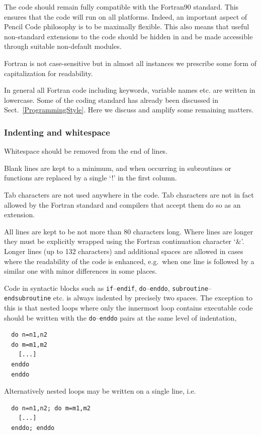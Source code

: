 \documentclass[\mydriver,12pt,twoside,notitlepage,a4paper]{article}
\newcommand{\code}[1]{\texttt{#1}}
\begin{document}
The code should remain fully compatible with the Fortran90 standard.
This ensures that the code will run on all platforms.
Indeed, an important aspect of {\sc Pencil Code} philosophy is to be maximally flexible.
This also means that useful non-standard extensions to the code should be hidden in and
be made accessible through suitable non-default modules.

Fortran is not case-sensitive but in almost all instances we prescribe
some form of capitalization for readability.

In general all Fortran code including keywords, variable names etc. are
written in lowercase.
Some of the coding standard has already been discussed in
Sect.~\ref{ProgrammingStyle}.
Here we discuss and amplify some remaining matters.

\subsubsection{Indenting and whitespace}

Whitespace should be removed from the end of lines.

Blank lines are kept to a minimum, and when occurring in subroutines
or functions are replaced by a single `!' in the first column.

Tab characters are not used anywhere in the code.  Tab characters are
not in fact allowed by the Fortran standard and compilers that accept
them do so as an extension.

All lines are kept to be not more than 80 characters long.
Where lines are longer they must be explicitly wrapped using the
Fortran continuation character `\&'.
Longer lines (up to 132 characters) and additional spaces are allowed
in cases where the readability of the code is enhanced, e.g.\ when one
line is followed by a similar one with minor differences in some places.

Code in syntactic blocks such as \code{if}--\code{endif}, \code{do}--\code{enddo},
\code{subroutine}--\code{endsubroutine} etc. is always indented by precisely two spaces.
The exception to this is that nested loops where only the innermost loop
contains executable code should be written with the \code{do}--\code{enddo}
pairs at the same level of indentation,
\begin{verbatim}
  do n=n1,n2
  do m=m1,m2
    [...]
  enddo
  enddo
\end{verbatim}
Alternatively nested loops may be written on a single line, i.e.
\begin{verbatim}
  do n=n1,n2; do m=m1,m2
    [...]
  enddo; enddo
\end{verbatim}
\end{document}
